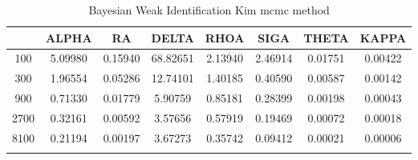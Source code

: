 \documentclass[a4paper,10pt]{article}
\begin{document}
\centering
\begin{longtable}{cccccccc}
\toprule
 & ALPHA & RA & DELTA & RHOA & SIGA & THETA & KAPPA \\
\midrule
100 & 5.09980 & 0.15940 & 68.82651 & 2.13940 & 2.46914 & 0.01751 & 0.00422 \\
300 & 1.96554 & 0.05286 & 12.74101 & 1.40185 & 0.40590 & 0.00587 & 0.00142 \\
900 & 0.71330 & 0.01779 & 5.90759 & 0.85181 & 0.28399 & 0.00198 & 0.00043 \\
2700 & 0.32161 & 0.00592 & 3.57656 & 0.57919 & 0.19469 & 0.00072 & 0.00018 \\
8100 & 0.21194 & 0.00197 & 3.67273 & 0.35742 & 0.09412 & 0.00021 & 0.00006 \\
\bottomrule
\caption{Bayesian Weak Identification Kim mcmc method}
\label{table:tbl:WeakKim_mcmc}
\end{longtable}
\end{document}
